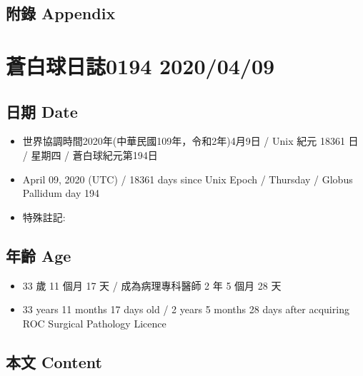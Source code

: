 \documentclass[a5paper, 11pt
]{book}
\providecommand{\tightlist}{%
  \setlength{\itemsep}{0pt}\setlength{\parskip}{0pt}}
\begin{document}
\hypertarget{ux9644ux9304-appendix-38}{%
\subsection{附錄 Appendix}\label{ux9644ux9304-appendix-38}}

\hypertarget{ux84bcux767dux7403ux65e5ux8a8c0194-20200409}{%
\section{蒼白球日誌0194
2020/04/09}\label{ux84bcux767dux7403ux65e5ux8a8c0194-20200409}}

\hypertarget{ux65e5ux671f-date-39}{%
\subsection{日期 Date}\label{ux65e5ux671f-date-39}}

\begin{itemize}
\tightlist
\item
  世界協調時間2020年(中華民國109年，令和2年)4月9日 / Unix 紀元 18361 日
  / 星期四 / 蒼白球紀元第194日
\item
  April 09, 2020 (UTC) / 18361 days since Unix Epoch / Thursday / Globus
  Pallidum day 194
\item
  特殊註記:
\end{itemize}

\hypertarget{ux5e74ux9f61-age-39}{%
\subsection{年齡 Age}\label{ux5e74ux9f61-age-39}}

\begin{itemize}
\tightlist
\item
  33 歲 11 個月 17 天 / 成為病理專科醫師 2 年 5 個月 28 天
\item
  33 years 11 months 17 days old / 2 years 5 months 28 days after
  acquiring ROC Surgical Pathology Licence
\end{itemize}

\hypertarget{ux672cux6587-content-39}{%
\subsection{本文 Content}\label{ux672cux6587-content-39}}
\end{document}
